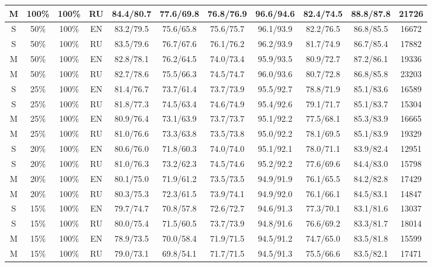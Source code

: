 \begin{table*}
{\begin{tabular}{|c|c|c|c||c|c|c|c|c|c||c|}
M & 100\% & 100\% & RU & 84.4/80.7 & 77.6/69.8 & 76.8/76.9 & 96.6/94.6 & 82.4/74.5 & 88.8/87.8 & 21726 \\ \hline
 S & 50\% & 100\% & EN & 83.2/79.5 & 75.6/65.8 & 75.6/75.7 & 96.1/93.9 & 82.2/76.5 & 86.8/85.5 & 16672 \\ \hline
 S & 50\% & 100\% & RU & 83.5/79.6 & 76.7/67.6 & 76.1/76.2 & 96.2/93.9 & 81.7/74.9 & 86.7/85.4 & 17882 \\ \hline
 M & 50\% & 100\% & EN & 82.8/78.1 & 76.2/64.5 & 74.0/73.4 & 95.9/93.5 & 80.9/72.7 & 87.2/86.1 & 19336 \\ \hline 
M & 50\% & 100\% & RU & 82.7/78.6 & 75.5/66.3 & 74.5/74.7 & 96.0/93.6 & 80.7/72.8 & 86.8/85.8 & 23203 \\ \hline 
S & 25\% & 100\% & EN & 81.4/76.7 & 73.7/61.4 & 73.7/73.9 & 95.5/92.7 & 78.8/71.9 & 85.1/83.6 & 16589 \\ \hline 
S & 25\% & 100\% & RU & 81.8/77.3 & 74.5/63.4 & 74.6/74.9 & 95.4/92.6 & 79.1/71.7 & 85.1/83.7 & 15304 \\ \hline 
M & 25\% & 100\% & EN & 80.9/76.4 & 73.1/63.9 & 73.7/73.7 & 95.1/92.2 & 77.5/68.1 & 85.3/83.9 & 16665 \\ \hline 
M & 25\% & 100\% & RU & 81.0/76.6 & 73.3/63.8 & 73.5/73.8 & 95.0/92.2 & 78.1/69.5 & 85.1/83.9 & 19329 \\ \hline 
S & 20\% & 100\% & EN & 80.6/76.0 & 71.8/60.3 & 74.0/74.0 & 95.1/92.1 & 78.0/71.1 & 83.9/82.4 & 12951 \\ \hline 
S & 20\% & 100\% & RU & 81.0/76.3 & 73.2/62.3 & 74.5/74.6 & 95.2/92.2 & 77.6/69.6 & 84.4/83.0 & 15798 \\ \hline
 M & 20\% & 100\% & EN & 80.1/75.0 & 71.9/61.2 & 73.5/73.5 & 94.9/91.9 & 76.1/65.5 & 84.2/82.8 & 17429 \\ \hline 
M & 20\% & 100\% & RU & 80.3/75.3 & 72.3/61.5 & 73.9/74.1 & 94.9/92.0 & 76.1/66.1 & 84.5/83.1 & 14847 \\ \hline
 S & 15\% & 100\% & EN & 79.7/74.7 & 70.8/57.8 & 72.6/72.7 & 94.6/91.3 & 77.3/70.1 & 83.1/81.6 & 13037 \\ \hline 
S & 15\% & 100\% & RU & 80.0/75.4 & 71.5/60.5 & 73.7/73.9 & 94.8/91.6 & 76.6/69.2 & 83.3/81.7 & 18014 \\ \hline
 M & 15\% & 100\% & EN & 78.9/73.5 & 70.0/58.4 & 71.9/71.5 & 94.5/91.2 & 74.7/65.0 & 83.5/81.8 & 15599 \\ \hline 
M & 15\% & 100\% & RU & 79.0/73.1 & 69.8/54.1 & 71.7/71.5 & 94.5/91.3 & 75.5/66.6 & 83.5/82.1 & 17471 \\ \hline

\end{tabular}}
\end{table*}
